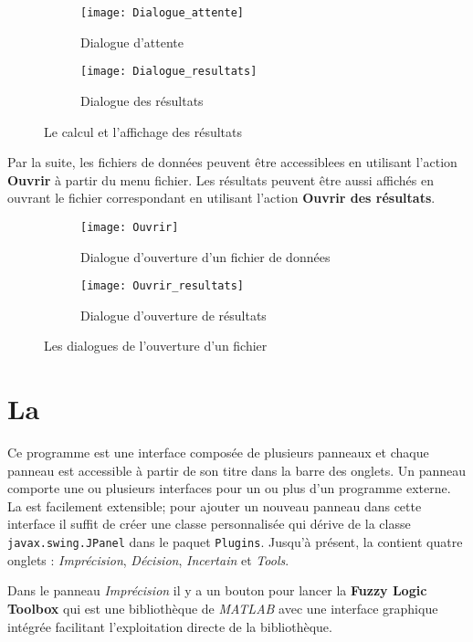\begin{figure}[H]
\begin{subfigure}{0.39\textwidth}
\texttt{[image: Dialogue\_attente]}
\caption{Dialogue d'attente}
\end{subfigure}
\hfill
\begin{subfigure}{0.59\textwidth}
\texttt{[image: Dialogue\_resultats]}
\caption{Dialogue des résultats}
\end{subfigure}
\caption{Le calcul et l'affichage des résultats}
\end{figure}

Par la suite, les fichiers de données peuvent être accessiblees en utilisant l'action \textbf{Ouvrir} à partir
du menu fichier. Les résultats peuvent être aussi affichés en ouvrant le fichier correspondant en utilisant l'action
\textbf{Ouvrir des résultats}.

\begin{figure}[H]
\begin{subfigure}{0.49\textwidth}
\texttt{[image: Ouvrir]}
\caption{Dialogue d'ouverture d'un fichier de données}
\end{subfigure}
\hfill
\begin{subfigure}{0.49\textwidth}
\texttt{[image: Ouvrir\_resultats]}
\caption{Dialogue d'ouverture de résultats}
\end{subfigure}
\caption{Les dialogues de l'ouverture d'un fichier}
\end{figure}

\section{La \platformename}

Ce programme est une interface composée de plusieurs panneaux et chaque panneau est accessible
à partir de son titre dans la barre des onglets. Un panneau comporte une ou plusieurs interfaces pour
un ou plus d'un programme externe.  La \platformename est facilement extensible; pour ajouter un nouveau
panneau dans cette interface il suffit de créer une classe personnalisée qui dérive de la classe
\mbox{\texttt{javax.swing.JPanel}} dans le paquet \texttt{Plugins}. Jusqu'à présent, la \platformename
contient quatre onglets : \textit{Imprécision}, \textit{Décision}, \textit{Incertain}
et \textit{Tools}.

Dans le panneau \textit{Imprécision} il y a un bouton pour lancer la \textbf{Fuzzy Logic Toolbox} qui est une
bibliothèque de \textit{MATLAB} avec une interface graphique intégrée facilitant l'exploitation directe
de la bibliothèque.

